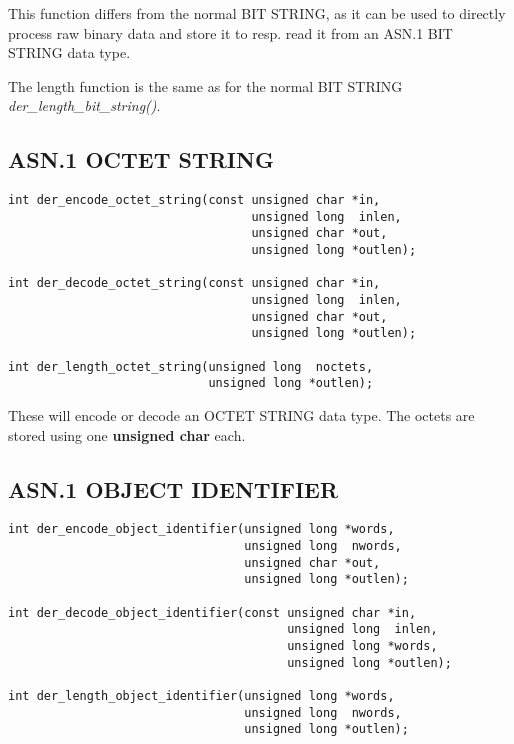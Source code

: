 \documentclass[synpaper]{book}
\begin{document}
This function differs from the normal BIT STRING, as it can be used to directly
process raw binary data and store it to resp. read it from an ASN.1 BIT STRING
data type.

The length function is the same as for the normal BIT STRING \textit{der\_length\_bit\_string()}.

\subsection{ASN.1 OCTET STRING}

\begin{verbatim}
int der_encode_octet_string(const unsigned char *in,
                                  unsigned long  inlen,
                                  unsigned char *out,
                                  unsigned long *outlen);

int der_decode_octet_string(const unsigned char *in,
                                  unsigned long  inlen,
                                  unsigned char *out,
                                  unsigned long *outlen);

int der_length_octet_string(unsigned long  noctets,
                            unsigned long *outlen);
\end{verbatim}

These will encode or decode an OCTET STRING data type.  The octets are stored using one \textbf{unsigned char} each.

\subsection{ASN.1 OBJECT IDENTIFIER}

\begin{verbatim}
int der_encode_object_identifier(unsigned long *words,
                                 unsigned long  nwords,
                                 unsigned char *out,
                                 unsigned long *outlen);

int der_decode_object_identifier(const unsigned char *in,
                                       unsigned long  inlen,
                                       unsigned long *words,
                                       unsigned long *outlen);

int der_length_object_identifier(unsigned long *words,
                                 unsigned long  nwords,
                                 unsigned long *outlen);
\end{verbatim}
\end{document}
